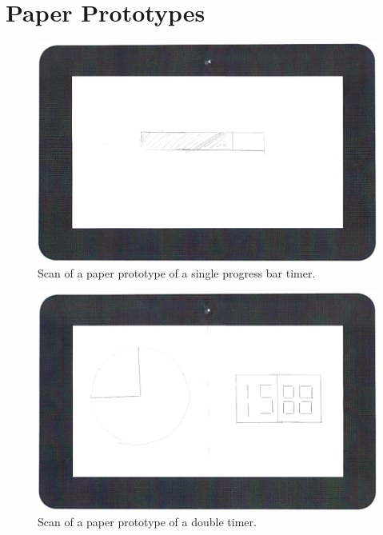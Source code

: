 
\section{Paper Prototypes}
	\label{sec:paper_prot}

	\begin{figure}[H]
		\centering
			\includegraphics[width=\textwidth]{Images/paper_prototype/timer_1.png}
				\caption{Scan of a paper prototype of a single progress bar timer.}
		\label{fig:pap_prot_progbar}
	\end{figure}
	
	\begin{figure}[H]
		\centering
			\includegraphics[width=\textwidth]{Images/paper_prototype/timer_2.png}
				\caption{Scan of a paper prototype of a double timer.}
		\label{fig:pap_prot_timedoub1}
	\end{figure}

